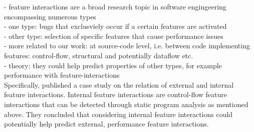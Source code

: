 - feature interactions are a broad research topic in software engingeering encompassing numerous types \\
- one type: bugs that exclusviely occur if a certain features are activated \\
- other type: selection of specific features that cause performance issues \\
- more related to our work: at source-code level, i.e. between code implementing features: control-flow, structural and potentially dataflow etc. \\
- theory: they could help predict properties of other types, for example performance with feature-interactions \\
Specifically, \citet{kolesnikov2017relation} published a case study on the relation of external and internal feature interactions.
Internal feature interactions are control-flow feature interactions that can be detected through static program analysis as mentioned above.
They concluded that considering internal feature interactions could potentially help predict external, performance feature interactions\cite{kolesnikov2017relation}.
